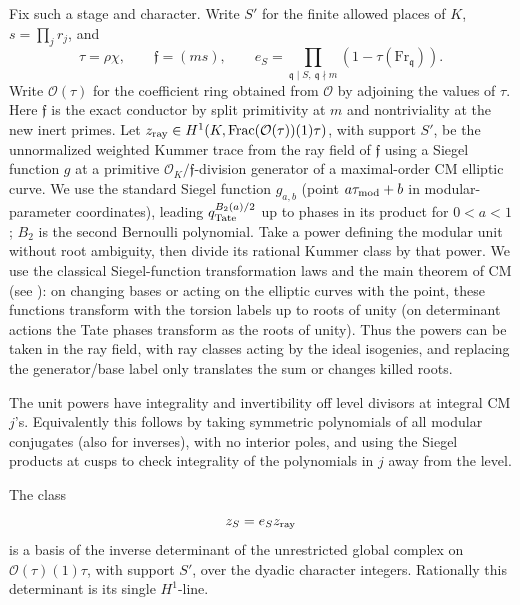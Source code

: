 Fix such a stage and character. Write \(S'\) for the finite allowed places of \(K\), \(s=\prod_j r_j\), and
\[
             \tau=\rho\chi,\qquad \mathfrak f=(m s),\qquad
             e_S=\prod_{\mathfrak q\mid S,\ \mathfrak q\nmid m}
                               (1-\tau(\mathrm{Fr}_{\mathfrak q})).
\]
Write \(\mathcal O(\tau)\) for the coefficient ring obtained from \(\mathcal
O\) by adjoining the values of \(\tau\).  Here \(\mathfrak f\) is the exact
conductor by split primitivity at \(m\) and nontriviality at the new inert
primes. Let \(z_{\rm ray}\in H^1(K,\operatorname{Frac}(\mathcal
O(\tau))(1)\tau)\), with support \(S'\), be the unnormalized weighted Kummer
trace from the ray field of \(\mathfrak f\) using a Siegel function \(g\) at a
primitive \(\mathcal O_K/\mathfrak f\)-division generator of a maximal-order
CM elliptic curve. We use the standard Siegel function \(g_{a,b}\) (point
\(a\tau_{\rm mod}+b\) in modular-parameter coordinates), leading \(q_{\rm
Tate}^{B_2(a)/2}\) up to phases in its product for \(0<a<1\); \(B_2\) is the
second Bernoulli polynomial. Take a power defining the modular unit without
root ambiguity, then divide its rational Kummer class by that power. We use
the classical Siegel-function transformation laws and the main theorem of CM
(see \cite[Section~2.2]{Oukhaba03}): on changing bases or acting on the
elliptic curves with the point, these functions transform with the torsion
labels up to roots of unity (on determinant actions the Tate phases transform
as the roots of unity). Thus the powers can be taken in the ray field, with
ray classes acting by the ideal isogenies, and replacing the generator/base
label only translates the sum or changes killed roots.

The unit powers have integrality and invertibility off level divisors at
integral CM \(j\)'s. Equivalently this follows by taking symmetric polynomials
of all modular conjugates (also for inverses), with no interior poles, and
using the Siegel products at cusps to check integrality of the polynomials in
\(j\) away from the level.

\begin{proposition}\label{cyclic:ray-basis}
The class
\[
 z_S=e_Sz_{\rm ray}
\]
is a basis of the inverse determinant of the unrestricted global
complex on \(\mathcal O(\tau)(1)\tau\), with support \(S'\), over the
dyadic character integers.  Rationally this determinant is its single
\(H^1\)-line.
\end{proposition}

